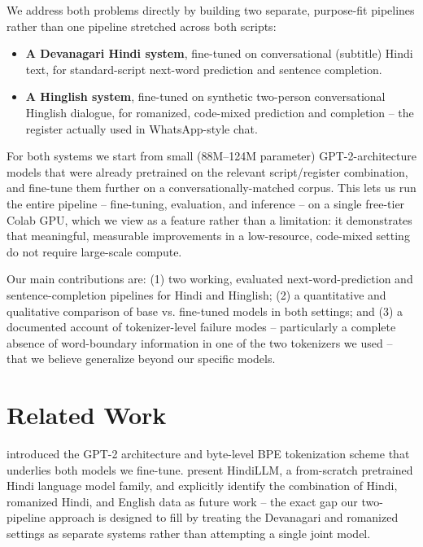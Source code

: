 \documentclass[11pt]{article}
\begin{document}
We address both problems directly by building two separate, purpose-fit pipelines rather than one pipeline stretched across both scripts:

\begin{itemize}
\item \textbf{A Devanagari Hindi system}, fine-tuned on conversational (subtitle) Hindi text, for standard-script next-word prediction and sentence completion.
\item \textbf{A Hinglish system}, fine-tuned on synthetic two-person conversational Hinglish dialogue, for romanized, code-mixed prediction and completion -- the register actually used in WhatsApp-style chat.
\end{itemize}

For both systems we start from small (88M--124M parameter) GPT-2-architecture models that were already pretrained on the relevant script/register combination, and fine-tune them further on a conversationally-matched corpus. This lets us run the entire pipeline -- fine-tuning, evaluation, and inference -- on a single free-tier Colab GPU, which we view as a feature rather than a limitation: it demonstrates that meaningful, measurable improvements in a low-resource, code-mixed setting do not require large-scale compute.

Our main contributions are: (1) two working, evaluated next-word-prediction and sentence-completion pipelines for Hindi and Hinglish; (2) a quantitative and qualitative comparison of base vs. fine-tuned models in both settings; and (3) a documented account of tokenizer-level failure modes -- particularly a complete absence of word-boundary information in one of the two tokenizers we used -- that we believe generalize beyond our specific models.

\section{Related Work}

\citet{radford2019language} introduced the GPT-2 architecture and byte-level BPE tokenization scheme that underlies both models we fine-tune. \citet{hindillm2024} present HindiLLM, a from-scratch pretrained Hindi language model family, and explicitly identify the combination of Hindi, romanized Hindi, and English data as future work -- the exact gap our two-pipeline approach is designed to fill by treating the Devanagari and romanized settings as separate systems rather than attempting a single joint model.
\end{document}
